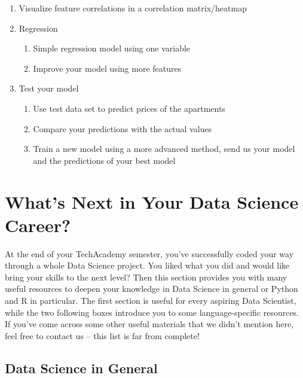 \documentclass[
  11pt,
]{article}
\begin{document}
\begin{enumerate}
\def\labelenumi{\arabic{enumi}.}
\item
  Visualize feature correlations in a correlation matrix/heatmap
\item
  Regression

  \begin{enumerate}
  \def\labelenumii{\alph{enumii}.}
  \item
    Simple regression model using one variable
  \item
    Improve your model using more features
  \end{enumerate}
\item
  Test your model

  \begin{enumerate}
  \def\labelenumii{\alph{enumii}.}
  \item
    Use test data set to predict prices of the apartments
  \item
    Compare your predictions with the actual values
  \item
    Train a new model using a more advanced method, send us your model and the predictions of your best model
  \end{enumerate}
\end{enumerate}

\newpage

\hypertarget{whats-next-in-your-data-science-career}{%
\section{What's Next in Your Data Science Career?}\label{whats-next-in-your-data-science-career}}

At the end of your TechAcademy semester, you've successfully coded your way through a whole Data Science project. You liked what you did and would like bring your skills to the next level? Then this section provides you with many useful resources to deepen your knowledge in Data Science in general or Python and R in particular. The first section is useful for every aspiring Data Scientist, while the two following boxes introduce you to some language-specific resources. If you've come across some other useful materials that we didn't mention here, feel free to contact us -- this list is far from complete!

\hypertarget{data-science-in-general}{%
\subsection{Data Science in General}\label{data-science-in-general}}
\end{document}
